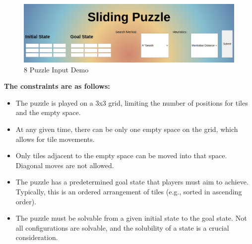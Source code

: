 \documentclass[12pt]{article}
\begin{document}
\begin{figure}[h]
  \centerline{\includegraphics[width = 150mm]{Sliding_Input_demo.png}}
  \caption{8 Puzzle Input Demo}
  \label{fig}
\end{figure}

\textbf{The constraints are as follows:}
\begin{itemize}
    \item The puzzle is played on a 3x3 grid, limiting the number of positions for tiles and the empty space.
    \item At any given time, there can be only one empty space on the grid, which allows for tile movements.
    \item Only tiles adjacent to the empty space can be moved into that space. Diagonal moves are not allowed.
    \item The puzzle has a predetermined goal state that players must aim to achieve. Typically, this is an ordered arrangement of tiles (e.g., sorted in ascending order).
    \item The puzzle must be solvable from a given initial state to the goal state. Not all configurations are solvable, and the solubility of a state is a crucial consideration.
\end{itemize}
\end{document}
